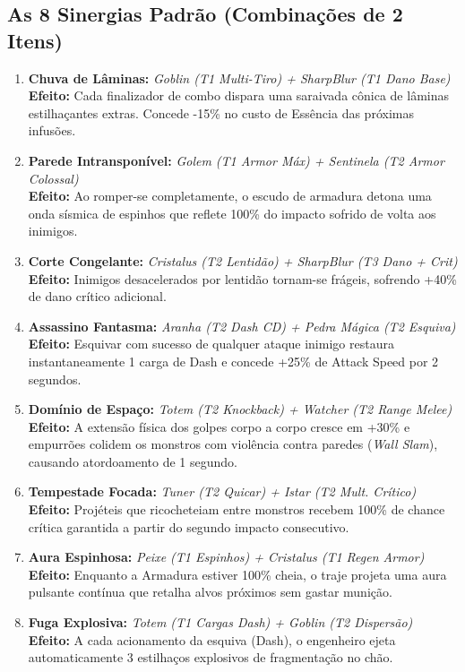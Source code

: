 \documentclass[a4paper,12pt]{report}
\begin{document}
\subsection{As 8 Sinergias Padrão (Combinações de 2 Itens)}
\begin{enumerate}
    \item \textbf{Chuva de Lâminas:} \textit{Goblin (T1 Multi-Tiro) + SharpBlur (T1 Dano Base)} \\
    \textbf{Efeito:} Cada finalizador de combo dispara uma saraivada cônica de lâminas estilhaçantes extras. Concede -15\% no custo de Essência das próximas infusões.
    \item \textbf{Parede Intransponível:} \textit{Golem (T1 Armor Máx) + Sentinela (T2 Armor Colossal)} \\
    \textbf{Efeito:} Ao romper-se completamente, o escudo de armadura detona uma onda sísmica de espinhos que reflete 100\% do impacto sofrido de volta aos inimigos.
    \item \textbf{Corte Congelante:} \textit{Cristalus (T2 Lentidão) + SharpBlur (T3 Dano + Crit)} \\
    \textbf{Efeito:} Inimigos desacelerados por lentidão tornam-se frágeis, sofrendo +40\% de dano crítico adicional.
    \item \textbf{Assassino Fantasma:} \textit{Aranha (T2 Dash CD) + Pedra Mágica (T2 Esquiva)} \\
    \textbf{Efeito:} Esquivar com sucesso de qualquer ataque inimigo restaura instantaneamente 1 carga de Dash e concede +25\% de Attack Speed por 2 segundos.
    \item \textbf{Domínio de Espaço:} \textit{Totem (T2 Knockback) + Watcher (T2 Range Melee)} \\
    \textbf{Efeito:} A extensão física dos golpes corpo a corpo cresce em +30\% e empurrões colidem os monstros com violência contra paredes (\textit{Wall Slam}), causando atordoamento de 1 segundo.
    \item \textbf{Tempestade Focada:} \textit{Tuner (T2 Quicar) + Istar (T2 Mult. Crítico)} \\
    \textbf{Efeito:} Projéteis que ricocheteiam entre monstros recebem 100\% de chance crítica garantida a partir do segundo impacto consecutivo.
    \item \textbf{Aura Espinhosa:} \textit{Peixe (T1 Espinhos) + Cristalus (T1 Regen Armor)} \\
    \textbf{Efeito:} Enquanto a Armadura estiver 100\% cheia, o traje projeta uma aura pulsante contínua que retalha alvos próximos sem gastar munição.
    \item \textbf{Fuga Explosiva:} \textit{Totem (T1 Cargas Dash) + Goblin (T2 Dispersão)} \\
    \textbf{Efeito:} A cada acionamento da esquiva (Dash), o engenheiro ejeta automaticamente 3 estilhaços explosivos de fragmentação no chão.
\end{enumerate}
\end{document}
